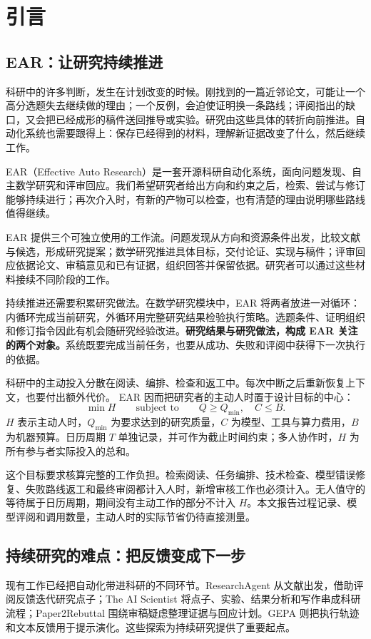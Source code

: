 \section{引言}
\label{sec:introduction}
\subsection{EAR：让研究持续推进}
\label{sec:position}
科研中的许多判断，发生在计划改变的时候。刚找到的一篇近邻论文，可能让一个高分选题失去继续做的理由；一个反例，会迫使证明换一条路线；评阅指出的缺口，又会把已经成形的稿件送回推导或实验。研究由这些具体的转折向前推进。自动化系统也需要跟得上：保存已经得到的材料，理解新证据改变了什么，然后继续工作。

EAR（Effective Auto Research）是一套开源科研自动化系统，面向问题发现、自主数学研究和评审回应。我们希望研究者给出方向和约束之后，检索、尝试与修订能够持续进行；再次介入时，有新的产物可以检查，也有清楚的理由说明哪些路线值得继续。

EAR 提供三个可独立使用的工作流。问题发现从方向和资源条件出发，比较文献与候选，形成研究提案；数学研究推进具体目标，交付论证、实现与稿件；评审回应依据论文、审稿意见和已有证据，组织回答并保留依据。研究者可以通过这些材料接续不同阶段的工作。

持续推进还需要积累研究做法。在数学研究模块中，EAR 将两者放进一对循环：内循环完成当前研究，外循环用完整研究结果检验执行策略。选题条件、证明组织和修订指令因此有机会随研究经验改进。\textbf{研究结果与研究做法，构成 EAR 关注的两个对象。}系统既要完成当前任务，也要从成功、失败和评阅中获得下一次执行的依据。

科研中的主动投入分散在阅读、编排、检查和返工中。每次中断之后重新恢复上下文，也要付出额外代价。 EAR 因而把研究者的主动人时置于设计目标的中心：
\begin{equation}
\min H\qquad \text{subject to}\qquad Q\ge Q_{\min},\quad C\le B.
\label{eq:human-objective}
\end{equation}
$H$ 表示主动人时，$Q_{\min}$ 为要求达到的研究质量，$C$ 为模型、工具与算力费用，$B$ 为机器预算。日历周期 $T$ 单独记录，并可作为截止时间约束；多人协作时，$H$ 为所有参与者实际投入的总和。

这个目标要求核算完整的工作负担。检索阅读、任务编排、技术检查、模型错误修复、失败路线返工和最终审阅都计入人时，新增审核工作也必须计入。无人值守的等待属于日历周期，期间没有主动工作的部分不计入 $H$。本文报告过程记录、模型评阅和调用数量，主动人时的实际节省仍待直接测量。

\subsection{持续研究的难点：把反馈变成下一步}
\label{sec:related}
现有工作已经把自动化带进科研的不同环节。ResearchAgent 从文献出发，借助评阅反馈迭代研究点子；The AI Scientist 将点子、实验、结果分析和写作串成科研流程；Paper2Rebuttal 围绕审稿疑虑整理证据与回应计划。GEPA 则把执行轨迹和文本反馈用于提示演化。这些探索为持续研究提供了重要起点。

